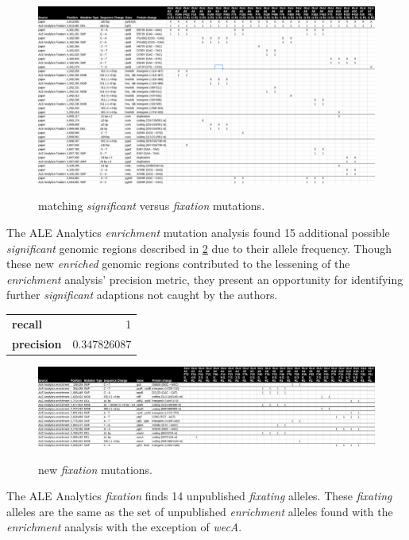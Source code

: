 \documentclass[12pt,final,masters,chapterheads]{ucsd}  %
\begin{document}
\begin{figure}[h!]
  \caption{matching \textit{significant} versus \textit{fixation} mutations.}
  \centering
  \includegraphics[width=\textwidth]{GLU_matching_fixation_muts.png}
  \label{fig:GLU_matching_fixation_muts}
\end{figure}

The ALE Analytics \textit{enrichment} mutation analysis found 15 additional possible \textit{significant} genomic regions described in \ref{fig:GLU_new_enrich_muts} due to their allele frequency. Though these new \textit{enriched} genomic regions contributed to the lessening of the \textit{enrichment} analysis' precision metric, they present an opportunity for identifying further \textit{significant} adaptions not caught by the authors.

\begin{table}[h!]
\centering
\begin{tabular}{ l r }
  \textbf{recall} & 1 \\
  \textbf{precision} & 0.347826087 \\
\end{tabular}
\end{table}

\begin{figure}[h!]
  \caption{new \textit{fixation} mutations.}
  \centering
  \includegraphics[width=\textwidth]{GLU_new_enrich_muts.png}
  \label{fig:GLU_new_enrich_muts}
\end{figure}

The ALE Analytics \textit{fixation} finds 14 unpublished \textit{fixating} alleles. These \textit{fixating} alleles are the same as the set of unpublished \textit{enrichment} alleles found with the \textit{enrichment} analysis with the exception of \textit{wecA}.
\end{document}
